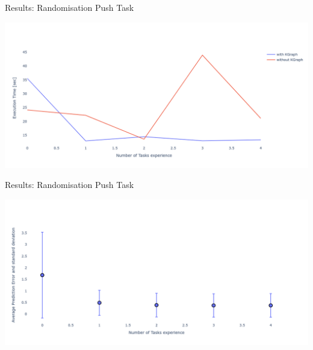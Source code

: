 \begin{frame}[fragile]{Results: Randomisation Push Task} %
\begin{center}
\includegraphics[width=1.0\textwidth]{figures/results/random_push_with_without_kgraph}
\end{center}
\end{frame}

\begin{frame}[fragile]{Results: Randomisation Push Task} %
\begin{center}
\includegraphics[width=1.0\textwidth]{figures/results/rand_push_pred_error}
\end{center}
\end{frame}

